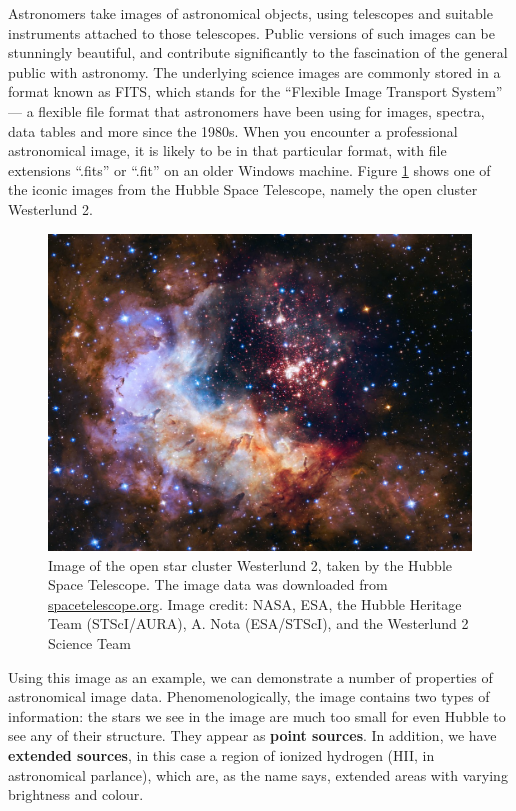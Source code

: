 \documentclass[twocolumn,apj]{openjournal}
\begin{document}
Astronomers take images of astronomical objects, using telescopes and suitable instruments attached to those telescopes. Public versions of such images can be stunningly beautiful, and contribute significantly to the fascination of the general public with astronomy. The underlying science images are commonly stored in a format known as FITS, which stands for the ``Flexible Image Transport System'' --- a flexible file format that astronomers have been using for images, spectra, data tables and more since the 1980s. When you encounter a professional astronomical image, it is likely to be in that particular format, with file extensions ``.fits'' or ``.fit'' on an older Windows machine. Figure \ref{Westerlund2} shows one of the iconic images from the Hubble Space Telescope, namely the open cluster Westerlund 2. 

\begin{figure}[htbp]
\begin{center}
\includegraphics[width=\linewidth]{heic1509a.jpg}
\caption{Image of the open star cluster Westerlund 2, taken by the Hubble Space Telescope. The image data was downloaded from \href{https://www.spacetelescope.org/images/heic1509a/}{spacetelescope.org}. Image credit: NASA, ESA, the Hubble Heritage Team (STScI/AURA), A. Nota (ESA/STScI), and the Westerlund 2 Science Team }
\label{Westerlund2}
\end{center}
\end{figure}
Using this image as an example, we can demonstrate a number of properties of astronomical image data. Phenomenologically, the image contains two types of information: the stars we see in the image are much too small for even Hubble to see any of their structure. They appear as {\bf point sources}. In addition, we have  {\bf extended sources}, in this case a region of ionized hydrogen (HII, in astronomical parlance), which are, as the name says, extended areas with varying brightness and colour.
\end{document}
